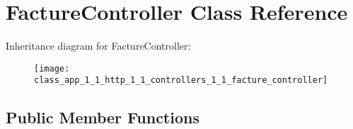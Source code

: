 \hypertarget{class_app_1_1_http_1_1_controllers_1_1_facture_controller}{}\section{Facture\+Controller Class Reference}
\label{class_app_1_1_http_1_1_controllers_1_1_facture_controller}
Inheritance diagram for Facture\+Controller\+:\begin{figure}[H]
\begin{center}
\leavevmode
\texttt{[image: class\_app\_1\_1\_http\_1\_1\_controllers\_1\_1\_facture\_controller]}
\end{center}
\end{figure}
\subsection*{Public Member Functions}
